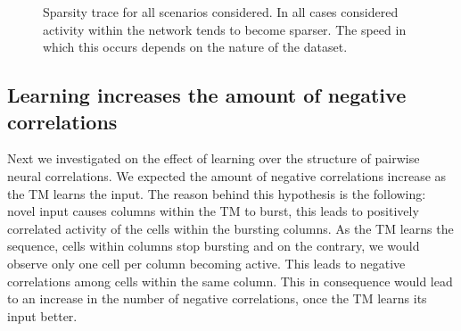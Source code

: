 \documentclass[11pt,letterpaper]{article}
\begin{document}
\begin{figure}[t]
{				    \label{fig22:c}
			    }
			    \caption{
			        Sparsity trace for all scenarios considered.
			        In all cases considered activity within the network tends
			        to become sparser. 
			        The speed in which this occurs depends on the nature
			        of the dataset.
			    }
			    \label{fig22}
		    \end{figure}
        
        \subsection{Learning increases the amount of negative correlations}
        
            Next we investigated on the effect of learning over the structure of pairwise
            neural correlations.
            We expected the amount of negative correlations increase as the
            TM learns the input.
            The reason behind this hypothesis is the following:
            novel input causes columns within the TM to burst, this leads to
            positively correlated activity of the cells within the bursting columns.
            As the TM learns the sequence, cells within columns stop bursting and
            on the contrary, we would observe only one cell per column becoming active.
            This leads to negative correlations among cells within the same column.
            This in consequence would lead to an increase in the number of negative
            correlations, once the TM learns its input better.
            
\end{document}
